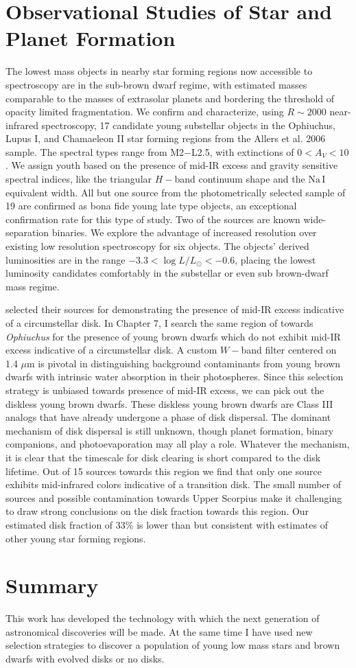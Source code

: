 \section{Observational Studies of Star and Planet Formation}

The lowest mass objects in nearby star forming regions now accessible to spectroscopy are in the sub-brown dwarf regime, with estimated masses comparable to the masses of extrasolar planets and bordering the threshold of opacity limited fragmentation.  We confirm and characterize, using $R\sim 2000$ near-infrared spectroscopy, 17 candidate young substellar objects in the Ophiuchus, Lupus I, and Chamaeleon II star forming regions from the Allers et al. 2006 sample.  The spectral types range from M2$-$L2.5, with extinctions of $0 < A_V < 10$.  We assign youth based on the presence of mid-IR excess and gravity sensitive spectral indices, like the triangular $H-$band continuum shape and the $\mathrm{Na\, I}$ equivalent width.  All but one source from the photometrically selected sample of 19 are confirmed as bona fide young late type objects, an exceptional confirmation rate for this type of study.  Two of the sources are known wide-separation binaries.  We explore the advantage of increased resolution over existing low resolution spectroscopy for six objects.  The objects' derived luminosities are in the range $-3.3 < \log L/L_{\odot} < -0.6$, placing the lowest luminosity candidates comfortably in the substellar or even sub brown-dwarf mass regime.

\citet{allers06} selected their sources for demonstrating the presence of mid-IR excess indicative of a circumstellar disk.  In Chapter 7, I search the same region of \citet{allers06} towards \emph{Ophiuchus} for the presence of young brown dwarfs which do not exhibit mid-IR excess indicative of a circumstellar disk.  A custom $W-$band filter centered on 1.4 $\mu$m is pivotal in distinguishing background contaminants from young brown dwarfs with intrinsic water absorption in their photospheres.  Since this selection strategy is unbiased towards presence of mid-IR excess, we can pick out the diskless young brown dwarfs.  These diskless young brown dwarfs are Class III analogs that have already undergone a phase of disk dispersal.  The dominant mechanism of disk dispersal is still unknown, though planet formation, binary companions, and photoevaporation may all play a role.  Whatever the mechanism, it is clear that the timescale for disk clearing is short compared to the disk lifetime.  Out of 15 sources towards this region we find that only one source exhibits mid-infrared colors indicative of a transition disk.  The small number of sources and possible contamination towards Upper Scorpius make it challenging to draw strong conclusions on the disk fraction towards this region.  Our estimated disk fraction of 33\% is lower than but consistent with estimates of other young star forming regions.

\section{Summary}
This work has developed the technology with which the next generation of astronomical discoveries will be made.  At the same time I have used new selection strategies to discover a population of young low mass stars and brown dwarfs with evolved disks or no disks.
